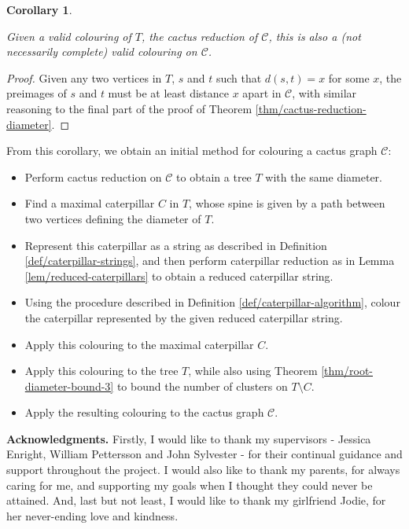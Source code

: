 \documentclass{mpaper}
\newtheorem{corollary}{Corollary}[section]
\begin{document}
\begin{corollary}
\label{cor/colouring-extension}

Given a valid colouring of $T$, the cactus reduction of $\mathcal{C}$, this is also a (not necessarily complete) valid colouring on $\mathcal{C}$.
\end{corollary}

\begin{proof}
Given any two vertices in $T$, $s$ and $t$ such that $d(s,t)=x$ for some $x$, the preimages of $s$ and $t$ must be at least distance $x$ apart in $\mathcal{C}$, with similar reasoning to the final part of the proof of Theorem \ref{thm/cactus-reduction-diameter}.
\end{proof}

From this corollary, we obtain an initial method for colouring a cactus graph $\mathcal{C}$:

\begin{itemize}
  \item Perform cactus reduction on $\mathcal{C}$ to obtain a tree $T$ with the same diameter.
  \item Find a maximal caterpillar $C$ in $T$, whose spine is given by a path between two vertices defining the diameter of $T$.
  \item Represent this caterpillar as a string as described in Definition \ref{def/caterpillar-strings}, and then perform caterpillar reduction as in Lemma \ref{lem/reduced-caterpillars} to obtain a reduced caterpillar string.
  \item Using the procedure described in Definition \ref{def/caterpillar-algorithm}, colour the caterpillar represented by the given reduced caterpillar string.
  \item Apply this colouring to the maximal caterpillar $C$.
  \item Apply this colouring to the tree $T$, while also using Theorem \ref{thm/root-diameter-bound-3} to bound the number of clusters on $T \setminus C$.
  \item Apply the resulting colouring to the cactus graph $\mathcal{C}$.
\end{itemize}

{\bf Acknowledgments.}
Firstly, I would like to thank my supervisors - Jessica Enright, William Pettersson and John Sylvester - for their continual guidance and support throughout the project. I would also like to thank my parents, for always caring for me, and supporting my goals when I thought they could never be attained. And, last but not least, I would like to thank my girlfriend Jodie, for her never-ending love and kindness.



\end{document}
